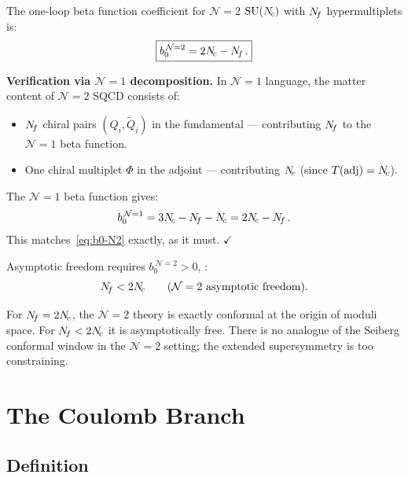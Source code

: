 \documentclass[11pt,a4paper]{article}
\begin{document}
The one-loop beta function coefficient for $\mathcal{N}=2$ $\mathrm{SU}(N_{\!c})$
with $N_{\!f}$ hypermultiplets is:
\begin{equation}\label{eq:b0-N2}
  \boxed{b_0^{\,\mathcal{N}=2} = 2N_{\!c} - N_{\!f}\,.}
\end{equation}

\textbf{Verification via $\mathcal{N}=1$ decomposition.}
In $\mathcal{N}=1$ language, the matter content of $\mathcal{N}=2$ SQCD
consists of:
\begin{itemize}
  \item $N_{\!f}$ chiral pairs $(Q_i, \widetilde{Q}_i)$ in the fundamental
    --- contributing $N_{\!f}$ to the $\mathcal{N}=1$ beta function.
  \item One chiral multiplet $\Phi$ in the adjoint --- contributing $N_{\!c}$
    (since $T(\mathrm{adj}) = N_{\!c}$).
\end{itemize}
The $\mathcal{N}=1$ beta function gives:
\begin{equation}\label{eq:b0-N1-check}
  b_0^{\,\mathcal{N}=1} = 3N_{\!c} - N_{\!f} - N_{\!c} = 2N_{\!c} - N_{\!f}\,.
\end{equation}
This matches~\eqref{eq:b0-N2} exactly, as it must.
\quad$\checkmark$

\medskip

Asymptotic freedom requires $b_0^{\,\mathcal{N}=2} > 0$, \ie:
\begin{equation}\label{eq:N2-AF}
  N_{\!f} < 2N_{\!c}
  \qquad\text{($\mathcal{N}=2$ asymptotic freedom).}
\end{equation}

\begin{remark}[$\mathcal{N}=2$ conformal window]
  For $N_{\!f} = 2N_{\!c}$, the $\mathcal{N}=2$ theory is exactly conformal at
  the origin of moduli space.  For $N_{\!f} < 2N_{\!c}$ it is asymptotically
  free.  There is no analogue of the Seiberg conformal window in the
  $\mathcal{N}=2$ setting; the extended supersymmetry is too constraining.
\end{remark}


\section{The Coulomb Branch}
\label{sec:coulomb}

\subsection{Definition}
\end{document}

